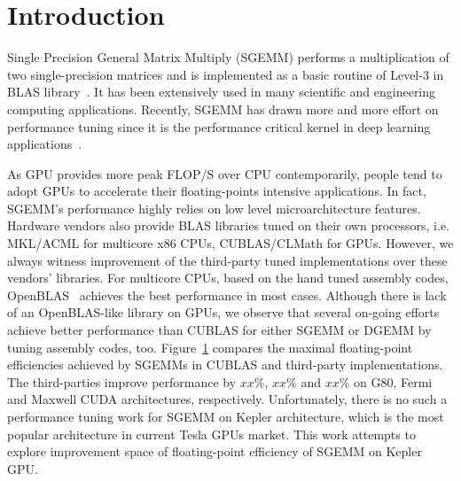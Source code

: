 \documentclass{sig-alternate-05-2015}
\begin{document}
%
%

%
%
\printccsdesc



\section{Introduction}
Single Precision General Matrix Multiply (SGEMM) performs a multiplication of two single-precision matrices and is implemented as a basic routine of Level-3 in BLAS library~\cite{}. It has been extensively used in many scientific and engineering computing applications. Recently, SGEMM has drawn more and more effort on performance tuning since it is the performance critical kernel in deep learning applications~\cite{}.

As GPU provides more peak FLOP/S over CPU contemporarily, people tend to adopt GPUs to accelerate their floating-points intensive applications. In fact, SGEMM's performance highly relies on low level microarchitecture features. Hardware vendors also provide BLAS libraries tuned on their own processors, i.e. MKL/ACML for multicore x86 CPUs, CUBLAS/CLMath for GPUs. However, we always witness improvement of the third-party tuned implementations over these vendors' libraries. For multicore CPUs, based on the hand tuned assembly codes, OpenBLAS~\cite{} achieves the best performance in most cases. Although there is lack of an OpenBLAS-like library on GPUs, we observe that several on-going efforts~\cite{} achieve better performance than CUBLAS for either SGEMM or DGEMM by tuning assembly codes, too. Figure~\ref{} compares the maximal floating-point efficiencies achieved by SGEMMs in CUBLAS and third-party implementations. The third-parties improve performance by $xx\%$, $xx\%$ and $xx\%$ on G80, Fermi and Maxwell CUDA architectures, respectively. Unfortunately, there is no such a performance tuning work for SGEMM on Kepler architecture, which is the most popular architecture in current Tesla GPUs market. This work attempts to explore improvement space of floating-point efficiency of SGEMM on Kepler GPU.
\end{document}
